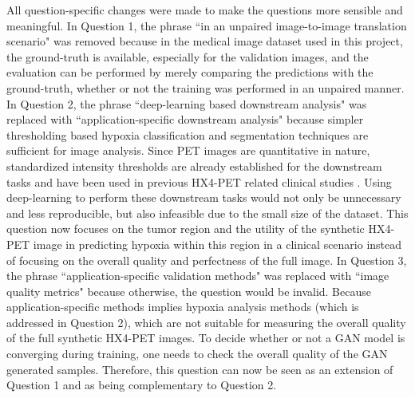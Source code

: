 All question-specific changes were made to make the questions more sensible and meaningful. In Question 1, the phrase ``in an unpaired image-to-image translation scenario" was removed because in the medical image dataset used in this project, the ground-truth is available, especially for the validation images, and the evaluation can be performed by merely comparing the predictions with the ground-truth, whether or not the training was performed in an unpaired manner. In Question 2, the phrase ``deep-learning based downstream analysis" was replaced with ``application-specific downstream analysis" because simpler thresholding based hypoxia classification and segmentation techniques are sufficient for image analysis. Since PET images are quantitative in nature, standardized intensity thresholds are already established for the downstream tasks and have been used in previous HX4-PET related clinical studies \cite{zegers2013hypoxia, even2017predicting, sanduleanu2020hypoxia}. Using deep-learning to perform these downstream tasks would not only be unnecessary and less reproducible, but also infeasible due to the small size of the dataset. This question now focuses on the tumor region and the utility of the synthetic HX4-PET image in predicting hypoxia within this region in a clinical scenario instead of focusing on the overall quality and perfectness of the full image. In Question 3, the phrase ``application-specific validation methods" was replaced with ``image quality metrics" because otherwise, the question would be invalid. Because application-specific methods implies hypoxia analysis methods (which is addressed in Question 2), which are not suitable for measuring the overall quality of the full synthetic HX4-PET images. To decide whether or not a GAN model is converging during training, one needs to check the overall quality of the GAN generated samples. Therefore, this question can now be seen as an extension of Question 1 and as being complementary to Question 2. 